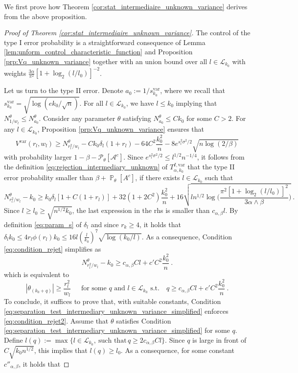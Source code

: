 \documentclass[twoside,11pt]{article}
\def\beq{\begin{equation}}
\def\eeq{\end{equation}}
\def\cA{\mathcal{A}}
\def\cL{\mathcal{L}}
\def\cP{\mathcal{P}}
\renewcommand{\P}{\operatorname{\mathbb{P}}}
\newcommand{\<}{\langle}
\renewcommand{\>}{\rangle}
\begin{document}
We first prove how Theorem \ref{cor:stat_intermediaire_unknown_variance} derives from the above proposition.

\begin{proof}[Proof of Theorem \ref{cor:stat_intermediaire_unknown_variance}]
  The control of the type I error probability is a straightforward consequence of Lemma \ref{lem:unform_control_characteristic_function} and  Proposition \ref{prp:Vq_unknown_variance} together with an union bound over all $l\in \cL_{k_0}$ with weights $\tfrac{3\alpha }{\pi^2} [1+\log_2(l/l_0)]^{-2}$.


  Let us turn to the type II error.  Denote $a_0:= 1/s_{k_0}^{\mathrm{var}}$, where we recall that $s_{k_0}^{\mathrm{var}}=\sqrt{\log(ek_0/\sqrt{n})}$. For all $l\in \cL_{k_0}$, we have $l\leq k_0$ implying that $N_{1/w_l}^{\theta}\leq N_{a_0}^{\theta}$.
Consider any parameter $\theta$ satisfying $N_{a_0}^{\theta}\leq C k_0$ for some $C>2$.  
For any $l\in \cL_{k_0}$, Proposition \ref{prp:Vq_unknown_variance} ensures that 
\[
 V^{\mathrm{var}}(r_l,w_l)\geq    N_{r_l^2/w_l}^{\theta} -  C k_0 \delta_l(1+r_l)  - 64 C^2\frac{k_0^2}{n}    - 8 e^{s^2_l\sigma^2/2} \sqrt{n\log(2/\beta)}
\]
with probability larger $1-\beta-\cP_{\theta}[\cA^c]$. Since $e^{s^2_l\sigma^2/2}\leq l^{1/2}n^{-1/4}$, it follows from the definition \eqref{eq:rejection_intermediary_unknown} of $T^{I,\mathrm{var}}_{\alpha,k_0}$ that the type II error probability  smaller than $\beta+\P_{\theta}[A^c]$, if there exists $l\in \cL_{k_0}$ such that 
\beq\label{eq:condition_rejet}
 N_{r_l^2/w_l}^{\theta} - k_0 \geq      k_0\delta_l[1 +C(1+r_l)] +32(1+2C^2)\frac{k_0^2}{n}+ 16\sqrt{ln^{1/2}\log\Big( \frac{\pi^2 [1+\log_2(l/l_0)]^2}{3\alpha\wedge \beta }\Big)}\ .
\eeq
Since $l\geq l_0\geq \sqrt{n^{1/2}k_0}$, the last expression in the rhs is smaller than $c_{\alpha,\beta}l$. 
By definition \eqref{eq:param_s} of $\delta_l$ and since $r_k\geq 4$, it holds that $\delta_l k_0 \leq 4r_l\phi(r_l)k_0\leq 16 l (\tfrac{l}{k_0})^{7}\sqrt{\log(k_0/l)}$. As a consequence,  Condition  \eqref{eq:condition_rejet} simplifies as 
\[
 N_{r_l^2/w_l}^{\theta} - k_0 \geq    c_{\alpha,\beta} Cl + c' C^2\frac{k_0^2}{n}\ .
\]
which is equivalent  to 
\beq\label{eq:condition_rejet2}
 |\theta_{(k_0+q)}|\geq \frac{r_l^2}{w_l}\, \quad \text{ for some $q$ and $l\in \cL_{k_0}$ s.t.}\quad  q\geq c_{\alpha,\beta} Cl+ c' C^2\frac{k_0^2}{n}\ .
\eeq 
To conclude, it suffices to prove that, with suitable constants, Condition \eqref{eq:separation_test_intermediary_unknown_variance_simplified} enforces \eqref{eq:condition_rejet2}. Assume that $\theta$ satisfies Condition \eqref{eq:separation_test_intermediary_unknown_variance_simplified} for some $q$. Define $l(q):=\max \{l\in \cL_{k_0},\ \text{such that} \,  q\geq 2c_{\alpha,\beta} Cl \}$. Since $q$ is large in front of $C\sqrt{k_0n^{1/2}}$, this implies that $l(q)\geq l_0$. As a consequence,  for some constant $c''_{\alpha,\beta}$, it holds that

\end{proof}
\end{document}
